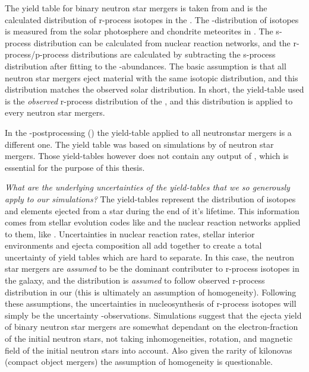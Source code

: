 The yield table for binary neutron star mergers is taken from \cite{arnould07} and is the calculated distribution of r-process isotopes in the \sos.
The \sos-distribution of isotopes is measured from the solar photosphere and chondrite meteorites in \cite{landolt93}.
The s-process distribution can be calculated from nuclear reaction networks, and the r-process/p-process distributions are calculated by subtracting the s-process distribution after fitting to the \sos-abundances.
The basic assumption is that all neutron star mergers eject material with the same isotopic distribution, and this distribution matches the observed solar distribution.
In short, the yield-table used is the \textit{observed} r-process distribution of the \sos, and this distribution is applied to every neutron star mergers.

In the \eris-postprocessing () the yield-table applied to all neutronstar mergers is a different one.
The yield table was based on simulations by  of neutron star mergers. Those yield-tables however does not contain any output of , which is essential for the purpose of this thesis.

\textit{What are the underlying uncertainties of the yield-tables that we so generously apply to our simulations?}
The yield-tables represent the distribution of isotopes and elements ejected from a star during the end of it's lifetime. This information comes from stellar evolution codes like \cite{paxton11} and the nuclear reaction networks applied to them, like \cite{pignatari16}.
Uncertainties in nuclear reaction rates, stellar interior environments and ejecta composition all add together to create a total uncertainty of yield tables which are hard to separate.
In this case, the neutron star mergers are \textit{assumed} to be the dominant contributer to r-process isotopes in the galaxy, and the distribution is \textit{assumed} to follow observed r-process distribution in our \sos (this is ultimately an assumption of homogeneity).
Following these assumptions, the uncertainties in nucleosynthesis of r-process isotopes will simply be the uncertainty \sos-observations\cite{arnould07}.
Simulations suggest that the ejecta yield of binary neutron star mergers are somewhat dependant on the electron-fraction of the initial neutron stars, not taking inhomogeneities, rotation, and magnetic field of the initial neutron stars into account. Also given the rarity of kilonovas (compact object mergers) the assumption of homogeneity is questionable.

